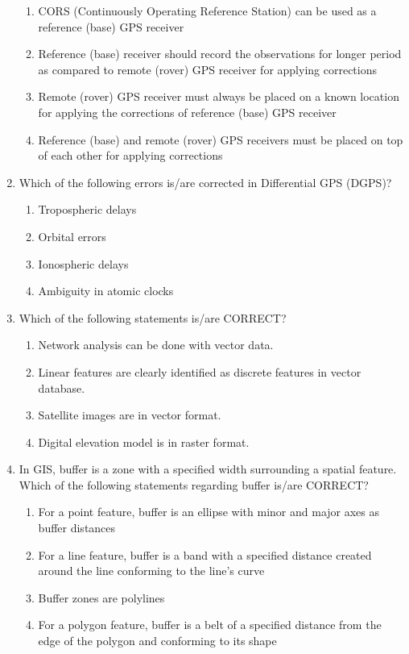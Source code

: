 \documentclass[12pt]{article}
\begin{document}
\begin{enumerate}
\begin{enumerate}
  \item CORS (Continuously Operating Reference Station) can be used as a reference
(base) GPS receiver 
   \item Reference (base) receiver should record the observations for longer period as
compared to remote (rover) GPS receiver for applying corrections  
   \item Remote (rover) GPS receiver must always be placed on a known location for
applying the corrections of reference (base) GPS receiver 
   \item Reference (base) and remote (rover) GPS receivers must be placed on top of each
other for applying corrections
\end{enumerate}

\item Which of the following errors is/are corrected in Differential GPS (DGPS)?

\begin{enumerate}
   \item Tropospheric delays 
   \item Orbital errors 
   \item Ionospheric delays 
   \item Ambiguity in atomic clocks
\end{enumerate}


\item Which of the following statements is/are CORRECT?

\begin{enumerate}
    \item Network analysis can be done with vector data. 
   \item Linear features are clearly identified as discrete features in vector database. 
   \item Satellite images are in vector format. 
   \item Digital elevation model is in raster format.
\end{enumerate}

\item  In GIS, buffer is a zone with a specified width surrounding a spatial feature. Which
of the following statements regarding buffer is/are CORRECT?

\begin{enumerate}
    \item For a point feature, buffer is an ellipse with minor and major axes as buffer
distances 
   \item For a line feature, buffer is a band with a specified distance created around the line
conforming to the line’s curve 
   \item Buffer zones are polylines 
   \item For a polygon feature, buffer is a belt of a specified distance from the edge of the
polygon and conforming to its shape
\end{enumerate}


\end{enumerate}
\end{document}
